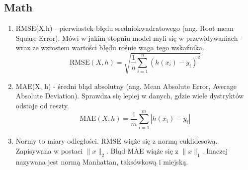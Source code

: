 \documentclass[polish,12pt,a4paper]{article}
\begin{document}
	\subsection{Math}
	\begin{enumerate}
		\item RMSE(X,h) - pierwiastek błędu sredniokwadratowego (ang. Root mean Square Error). Mówi w jakim stopniu model myli się w przewidywaniach - wraz ze wzrostem wartości błędu rośnie waga tego wskaźnika.
		\[
		\text{RMSE}(X, h) = \sqrt{\frac{1}{n} \sum_{i=1}^{n} (h(x_i) - y_i)^2}
		\]
		\item MAE(X, h) - średni błąd absolutny (ang. Mean Absolute Error, Average Absolute Deviation). Sprawdza się lepiej w danych, gdzie wiele dystryktów odstaje od reszty.
		\[
		\text{MAE}(X, h) = \frac{1}{m} \sum_{i=1}^{m} |h(x_i) - y_i|
		\]
		\item Normy to miary odległości. RMSE wiąże się z normą euklidesową. Zapisywana w postaci
		$ \|x\|_2 $. Błąd MAE wiąże się z $ \|x\|_1 $. Inaczej nazywana jest normą Manhattan, taksówkową i miejską.
	\end{enumerate}
	
	
\end{document}
